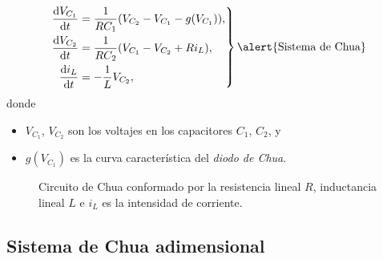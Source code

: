\begin{frame}
	\begin{minipage}{0.55\textwidth}
		\begin{equation}\label{eq:chua}
			\left.
			\begin{aligned}
				\diff{V_{C_{1}}}{t} & =\frac{1}{RC_{1}}(V_{C_{2}} - V_{C_{1}} - g(V_{C_{1}})), \\
				\diff{V_{C_{2}}}{t} & =\frac{1}{RC_{2}}(V_{C_{1}} - V_{C_{2}} + Ri_{L}),       \\
				\diff{i_{L}}{t}     & =-\frac{1}{L}V_{C_{2}},
			\end{aligned}
			\right\}
			\text{\alert{Sistema de Chua}}
		\end{equation}
		donde
		\begin{itemize}
			\item $V_{C_{1}}$, $V_{C_{2}}$ son los voltajes en los capacitores $C_{1}$, $C_{2}$, y
			\item $g\left(V_{C_{1}}\right)$ es la curva característica del \emph{diodo de Chua}.
		\end{itemize}
	\end{minipage}
	\begin{minipage}{0.35\textwidth}
		\begin{figure}[ht!]
			\centering
			
			\caption{Circuito de Chua conformado por la resistencia lineal $R$,
				inductancia lineal $L$ e $i_{L}$ es la intensidad de corriente.}\label{fig:chua_circuit}
		\end{figure}
	\end{minipage}

\end{frame}

\subsection{Sistema de Chua adimensional} %

